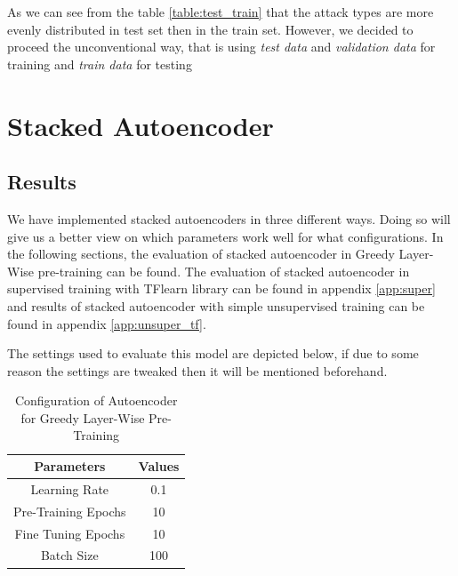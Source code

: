 \documentclass[12pt, a4paper]{report}
\begin{document}
As we can see from the table \ref{table:test_train} that the attack types are more evenly distributed in test set then in the train set. However, we decided to proceed the unconventional way, that is using \textit{test data} and \textit{validation data} for training and \textit{train data} for testing\\\par

\section{Stacked Autoencoder}\label{sec:autoencoder}

\subsection{Results}\label{results}

We have implemented stacked autoencoders in three different ways. Doing so will give us a better view on which parameters work well for what configurations. In the following sections, the evaluation of stacked autoencoder in Greedy Layer-Wise pre-training can be found. The evaluation of stacked autoencoder in supervised training with TFlearn library can be found in appendix \ref{app:super} and results of stacked autoencoder with simple unsupervised training can be found in appendix \ref{app:unsuper_tf}.

\clearpage
The settings used to evaluate this model are depicted below, if due to some reason the settings are tweaked then it will be mentioned beforehand.\\ 

\begin{table}[ht]
\centering
\begin{tabular}{|c|c|}
\hline
\textbf{Parameters} & \textbf{Values} \\ \hline
Learning Rate       & 0.1             \\ \hline
Pre-Training Epochs & 10              \\ \hline
Fine Tuning Epochs  & 10              \\ \hline
Batch Size          & 100             \\ \hline
\end{tabular}
\caption{Configuration of Autoencoder for Greedy Layer-Wise Pre-Training}
\label{config_auto_greedy}
\end{table}
\end{document}
